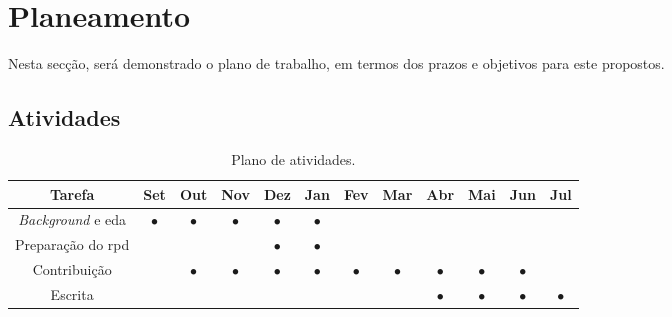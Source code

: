 \chapter{Planeamento}
\label{cap_planeamento}

Nesta secção, será demonstrado o plano de trabalho, em termos dos prazos e objetivos para este propostos.

\section{Atividades}


\begin{table}[H]
\begin{center}
\begin{tabular}{| c  |c|c  |c  |c  |c  |c  |c  |c  |c  |c  |c |}
\hline
\textbf{Tarefa} &  \textbf{Set}&\textbf{Out} & \textbf{Nov} & \textbf{Dez} & \textbf{Jan} & \textbf{Fev} & \textbf{Mar} & \textbf{Abr} & \textbf{Mai} & \textbf{Jun} & \textbf{Jul}\\
\hline
\textit{Background} e \acrshort{eda} &  $\bullet$ &$\bullet$ & $\bullet$ & $\bullet$ & $\bullet$& & & & & & \\
\hline
Preparação do \acrshort{rpd} &  && & $\bullet$ & $\bullet$ & & & & & & \\
\hline
Contribuição &  &$\bullet$& $\bullet$& $\bullet$&$\bullet$ &$\bullet$ &$\bullet$ &$\bullet$ &$\bullet$ &$\bullet$ & \\\hline
 Escrita &  && & & & & & $\bullet$ & $\bullet$ & $\bullet$ &$\bullet$ \\\hline
\end{tabular}
\end{center}
\caption{Plano de atividades.}
\end{table}

